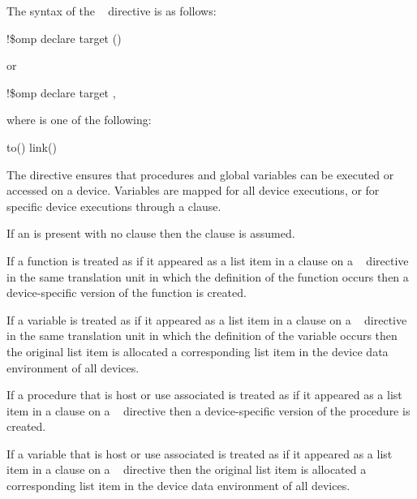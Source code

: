 {{{{\begin{samepage}

\fortranspecificstart
The syntax of the ~ directive is as follows:

\begin{boxedcode}
!\$omp declare target ()
\end{boxedcode}

or

\begin{boxedcode}
!\$omp declare target \plc{[clause[ [},\plc{] clause] ... ]} 
\end{boxedcode}

where  is one of the following:

\begin{indentedcodelist}
to()
link()
\end{indentedcodelist}
\fortranspecificend

\descr

The   directive ensures that procedures
and global variables can be executed or accessed on a device.
Variables are mapped for all device executions, or for specific
device executions through a  clause.

If an  is present with no clause then the 
clause is assumed.

\ccppspecificstart
If a function is treated as if it appeared as a list item in a  clause
on a ~ directive in the same translation unit in
which the definition of the function occurs then a device-specific version of
the function is created.

If a variable is treated as if it appeared as a list item in a  clause
on a ~ directive in the same translation unit in
which the definition of the variable occurs then the original list item is
allocated a corresponding list item in the device data environment of all
devices.  
\ccppspecificend

\fortranspecificstart
If a procedure that is host or use associated is treated as if it appeared as a
list item in a  clause on a ~ directive
then a device-specific version of the procedure is created.

If a variable that is host or use associated is treated as if it appeared as a
list item in a  clause on a ~ directive
then the original list item is allocated a corresponding list item in the
device data environment of all devices.
\fortranspecificend


\end{samepage}}}}}
